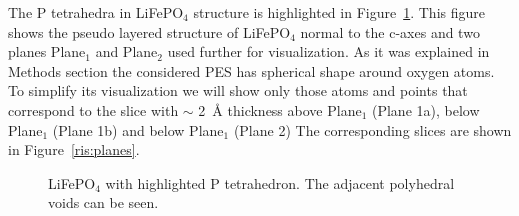 

The P tetrahedra in LiFePO$_4$ structure is highlighted in Figure~\ref{ris:Ploc_pic}. 
This figure shows the pseudo layered structure of LiFePO$_4$ normal to the c-axes and two planes Plane$_1$ and Plane$_2$ used further for visualization. 
As it was explained in Methods section the considered PES has spherical shape around oxygen atoms. To simplify its visualization we will show only those atoms and points that correspond to the slice with $\sim$ 2~{\AA} thickness above Plane$_1$ (Plane 1a), below Plane$_1$ (Plane 1b) and below Plane$_1$ (Plane 2)
The corresponding slices are shown in Figure~\ref{ris:planes}. 

\begin{figure}[h!]
\caption{LiFePO$_4$ with highlighted P tetrahedron. The adjacent polyhedral voids can be seen.}
\label{ris:Ploc_pic}
\end{figure}

